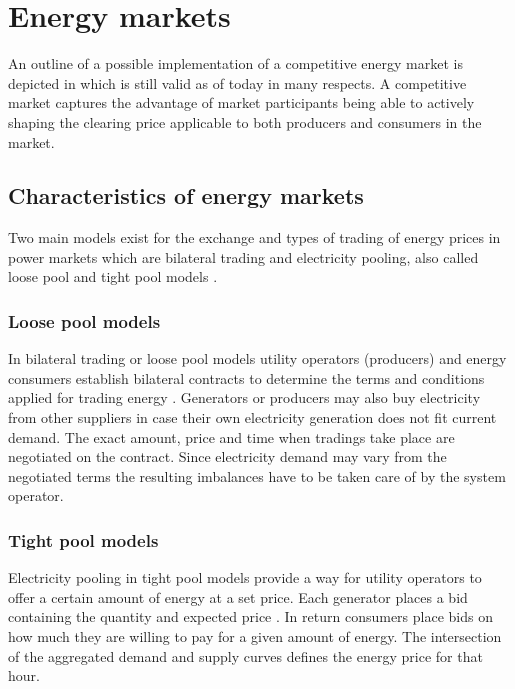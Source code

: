 

\section{Energy markets}


An outline of a possible implementation of a competitive energy market is depicted in \cite{hogan1993competitive} which is still valid as of today in many respects. A competitive market captures the advantage of market participants being able to actively shaping the clearing price applicable to both producers and consumers in the market. 




\subsection{Characteristics of energy markets}

Two main models exist for the exchange and types of trading of energy prices in power markets which are bilateral trading and electricity pooling, also called loose pool and tight pool models \cite{onaiwu2009does,hogan1997reshaping,barroso2005classification,reston2012short}.

\subsubsection{Loose pool models}

In bilateral trading or loose pool models utility operators (producers) and energy consumers establish bilateral contracts to determine the terms and conditions applied for trading energy \cite{onaiwu2009does,kalverboer2001electricity}. Generators or producers may also buy electricity from other suppliers in case their own electricity generation does not fit current demand. The exact amount, price and time when tradings take place are negotiated on the contract. Since electricity demand may vary from the negotiated terms the resulting imbalances have to be taken care of by the system operator. 

\subsubsection{Tight pool models}

Electricity pooling in tight pool models provide a way for utility operators to offer a certain amount of energy at a set price. Each generator places a bid containing the quantity and expected price \cite{barroso2005classification}. In return consumers place bids on how much they are willing to pay for a given amount of energy. The intersection of the aggregated demand and supply curves defines the energy price for that hour. 


